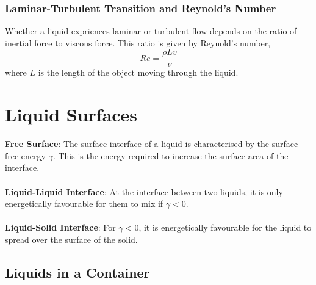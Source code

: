 \documentclass{book}
\begin{document}
\subsubsection{Laminar-Turbulent Transition and Reynold's Number}
Whether a liquid expriences laminar or turbulent flow depends on the ratio of inertial force to viscous force. This ratio is given by Reynold's number,
\begin{equation}
	\boxed{Re = \frac{\rho L v}{\nu}}
\end{equation}
where $L$ is the length of the object moving through the liquid.
\section{Liquid Surfaces}
\textbf{Free Surface}: The surface interface of a liquid is characterised by the surface free energy $\gamma$. This is the energy required to increase the surface area of the interface.\\\\
\textbf{Liquid-Liquid Interface}: At the interface between two liquids, it is only energetically favourable for them to mix if $\gamma <0$.\\\\
\textbf{Liquid-Solid Interface}: For $\gamma < 0$, it is energetically favourable for the liquid to spread over the surface of the solid.
\subsection{Liquids in a Container}
\end{document}
